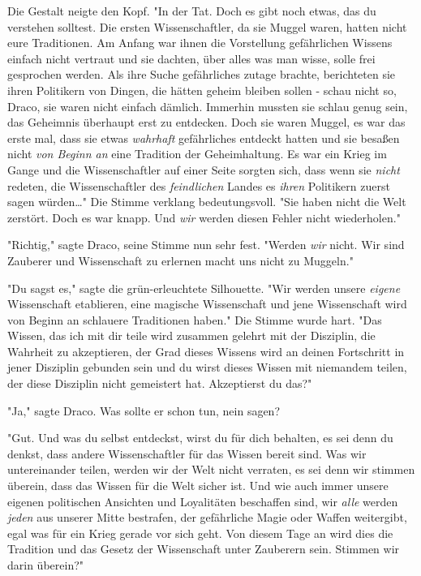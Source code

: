 {Die Gestalt neigte den Kopf. "In der Tat. Doch es gibt noch etwas, das du verstehen solltest. Die ersten Wissenschaftler, da sie Muggel waren, hatten nicht eure Traditionen. Am Anfang war ihnen die Vorstellung gefährlichen Wissens einfach nicht vertraut und sie dachten, über alles was man wisse, solle frei gesprochen werden. Als ihre Suche gefährliches zutage brachte, berichteten sie ihren Politikern von Dingen, die hätten geheim bleiben sollen - schau nicht so, Draco, sie waren nicht einfach dämlich. Immerhin mussten sie schlau genug sein, das Geheimnis überhaupt erst zu entdecken. Doch sie waren Muggel, es war das erste mal, dass sie etwas \emph{wahrhaft} gefährliches entdeckt hatten und sie besaßen nicht \emph{von Beginn an} eine Tradition der Geheimhaltung. Es war ein Krieg im Gange und die Wissenschaftler auf einer Seite sorgten sich, dass wenn sie \emph{nicht} redeten, die Wissenschaftler des \emph{feindlichen} Landes es \emph{ihren} Politikern zuerst sagen würden…" Die Stimme verklang bedeutungsvoll. "Sie haben nicht die Welt zerstört. Doch es war knapp. Und \emph{wir} werden diesen Fehler nicht wiederholen."

"Richtig," sagte Draco, seine Stimme nun sehr fest. "Werden \emph{wir} nicht. Wir sind Zauberer und Wissenschaft zu erlernen macht uns nicht zu Muggeln."

"Du sagst es," sagte die grün-erleuchtete Silhouette. "Wir werden unsere \emph{eigene} Wissenschaft etablieren, eine magische Wissenschaft und jene Wissenschaft wird von Beginn an schlauere Traditionen haben." Die Stimme wurde hart. "Das Wissen, das ich mit dir teile wird zusammen gelehrt mit der Disziplin, die Wahrheit zu akzeptieren, der Grad dieses Wissens wird an deinen Fortschritt in jener Disziplin gebunden sein und du wirst dieses Wissen mit niemandem teilen, der diese Disziplin nicht gemeistert hat. Akzeptierst du das?"

"Ja," sagte Draco. Was sollte er schon tun, nein sagen?

"Gut. Und was du selbst entdeckst, wirst du für dich behalten, es sei denn du denkst, dass andere Wissenschaftler für das Wissen bereit sind. Was wir untereinander teilen, werden wir der Welt nicht verraten, es sei denn wir stimmen überein, dass das Wissen für die Welt sicher ist. Und wie auch immer unsere eigenen politischen Ansichten und Loyalitäten beschaffen sind, wir \emph{alle} werden \emph{jeden} aus unserer Mitte bestrafen, der gefährliche Magie oder Waffen weitergibt, egal was für ein Krieg gerade vor sich geht. Von diesem Tage an wird dies die Tradition und das Gesetz der Wissenschaft unter Zauberern sein. Stimmen wir darin überein?"

}
